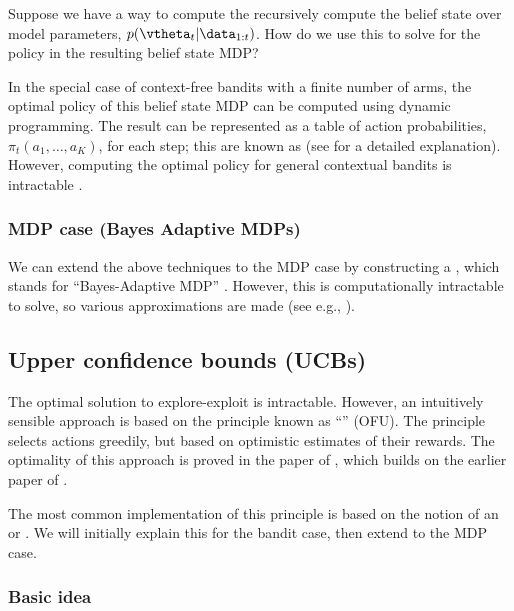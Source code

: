 Suppose we have a way to compute the recursively compute
the belief state over model parameters,
$p(\vtheta_t|\data_{1:t})$.
How do we use this to solve for the policy
in the resulting belief state MDP?

In the special case of context-free bandits with a finite number of arms,
the optimal policy of this belief state MDP can be computed
using dynamic programming.
The result can be represented as a table of action probabilities,
$\pi_t(a_1,\ldots,a_K)$,
for each step;
this are known as  
\citep{Gittins89}
(see \citep{Powell2012,Powell2022} for a detailed explanation).
However, computing the optimal policy
for general  contextual bandits is intractable
\citep{Papadimitriou87}.

\subsubsection{MDP case (Bayes Adaptive MDPs)}
\label{sec:BAMDP}

We can extend the above techniques to the MDP case
by constructing a ,
which stands for ``Bayes-Adaptive MDP''
\citep{Duff02}.
However, this is computationally intractable to solve,
so various approximations are made
(see e.g., \citep{Zintgraf2021,Arumugam2022bamdp,Mikulik2020}).


\subsection{Upper confidence bounds (UCBs)}
\label{sec:UCB}

The optimal solution to explore-exploit is intractable.
However, an intuitively sensible approach
is based on the principle known as
``''
(OFU).
The principle selects actions greedily, but based on
optimistic estimates of their rewards.
The optimality of this approach is proved in the
 paper of \citep{Tennenholtz2002},
which builds on the earlier  paper of
\citep{Kearns2002}.

The most common implementation of this principle is
based on the notion of an
 or .
We will initially explain this for the bandit case, then extend to the MDP case.

\subsubsection{Basic idea}

